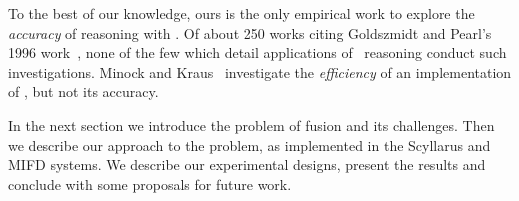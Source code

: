 To the best of our knowledge, ours is the only empirical work to explore the
\emph{accuracy} of reasoning with \zplus.
Of about 250 works citing Goldszmidt and Pearl's 1996
work~\cite{google-scholar-query}, none of the few which detail
applications of \zplus\ reasoning conduct such investigations.
%
Minock and Kraus~ investigate the
\emph{efficiency} of an implementation of \zplus,
but not its accuracy.
%
%

In the next section we introduce the problem of \ids fusion
and its challenges.  Then we describe our approach to the
problem, as implemented in the Scyllarus and MIFD systems.  We describe our
experimental designs, present the results and conclude with some proposals for
future work.

